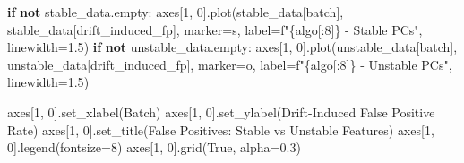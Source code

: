 \documentclass[
  letterpaper,
  DIV=11,
  numbers=noendperiod]{scrartcl}
\newenvironment{Shaded}{\begin{snugshade}}{\end{snugshade}}
\newcommand{\ControlFlowTok}[1]{\textcolor[rgb]{0.00,0.23,0.31}{\textbf{#1}}}
\newcommand{\DecValTok}[1]{\textcolor[rgb]{0.68,0.00,0.00}{#1}}
\newcommand{\FloatTok}[1]{\textcolor[rgb]{0.68,0.00,0.00}{#1}}
\newcommand{\KeywordTok}[1]{\textcolor[rgb]{0.00,0.23,0.31}{\textbf{#1}}}
\newcommand{\NormalTok}[1]{\textcolor[rgb]{0.00,0.23,0.31}{#1}}
\newcommand{\OperatorTok}[1]{\textcolor[rgb]{0.37,0.37,0.37}{#1}}
\newcommand{\SpecialCharTok}[1]{\textcolor[rgb]{0.37,0.37,0.37}{#1}}
\newcommand{\SpecialStringTok}[1]{\textcolor[rgb]{0.13,0.47,0.30}{#1}}
\newcommand{\StringTok}[1]{\textcolor[rgb]{0.13,0.47,0.30}{#1}}
\newcommand{\VariableTok}[1]{\textcolor[rgb]{0.07,0.07,0.07}{#1}}
\renewenvironment{Shaded}{%
  \begin{tcolorbox}[%
    enhanced,%
    colback=codebg,%
    colframe=codebg,%
    borderline west={3pt}{0pt}{sectionblue},%
    fontupper=\small\ttfamily,%
    boxrule=0pt,%
    arc=0pt,%
    boxsep=5pt,%
    left=2mm,%
    right=2mm,%
    top=2mm,%
    bottom=2mm%
  ]%
}{%
  \end{tcolorbox}%
}
\begin{document}
\begin{Shaded}
\begin{Highlighting}[]
    \ControlFlowTok{if} \KeywordTok{not}\NormalTok{ stable\_data.empty:}
\NormalTok{        axes[}\DecValTok{1}\NormalTok{, }\DecValTok{0}\NormalTok{].plot(stable\_data[}\StringTok{\textquotesingle{}batch\textquotesingle{}}\NormalTok{], stable\_data[}\StringTok{\textquotesingle{}drift\_induced\_fp\textquotesingle{}}\NormalTok{], }
\NormalTok{                       marker}\OperatorTok{=}\StringTok{\textquotesingle{}s\textquotesingle{}}\NormalTok{, label}\OperatorTok{=}\SpecialStringTok{f"}\SpecialCharTok{\{}\NormalTok{algo[:}\DecValTok{8}\NormalTok{]}\SpecialCharTok{\}}\SpecialStringTok{ {-} Stable PCs"}\NormalTok{, linewidth}\OperatorTok{=}\FloatTok{1.5}\NormalTok{)}
    \ControlFlowTok{if} \KeywordTok{not}\NormalTok{ unstable\_data.empty:}
\NormalTok{        axes[}\DecValTok{1}\NormalTok{, }\DecValTok{0}\NormalTok{].plot(unstable\_data[}\StringTok{\textquotesingle{}batch\textquotesingle{}}\NormalTok{], unstable\_data[}\StringTok{\textquotesingle{}drift\_induced\_fp\textquotesingle{}}\NormalTok{], }
\NormalTok{                       marker}\OperatorTok{=}\StringTok{\textquotesingle{}o\textquotesingle{}}\NormalTok{, label}\OperatorTok{=}\SpecialStringTok{f"}\SpecialCharTok{\{}\NormalTok{algo[:}\DecValTok{8}\NormalTok{]}\SpecialCharTok{\}}\SpecialStringTok{ {-} Unstable PCs"}\NormalTok{, linewidth}\OperatorTok{=}\FloatTok{1.5}\NormalTok{)}

\NormalTok{axes[}\DecValTok{1}\NormalTok{, }\DecValTok{0}\NormalTok{].set\_xlabel(}\StringTok{\textquotesingle{}Batch\textquotesingle{}}\NormalTok{)}
\NormalTok{axes[}\DecValTok{1}\NormalTok{, }\DecValTok{0}\NormalTok{].set\_ylabel(}\StringTok{\textquotesingle{}Drift{-}Induced False Positive Rate\textquotesingle{}}\NormalTok{)}
\NormalTok{axes[}\DecValTok{1}\NormalTok{, }\DecValTok{0}\NormalTok{].set\_title(}\StringTok{\textquotesingle{}False Positives: Stable vs Unstable Features\textquotesingle{}}\NormalTok{)}
\NormalTok{axes[}\DecValTok{1}\NormalTok{, }\DecValTok{0}\NormalTok{].legend(fontsize}\OperatorTok{=}\DecValTok{8}\NormalTok{)}
\NormalTok{axes[}\DecValTok{1}\NormalTok{, }\DecValTok{0}\NormalTok{].grid(}\VariableTok{True}\NormalTok{, alpha}\OperatorTok{=}\FloatTok{0.3}\NormalTok{)}


\end{Highlighting}
\end{Shaded}
\end{document}
